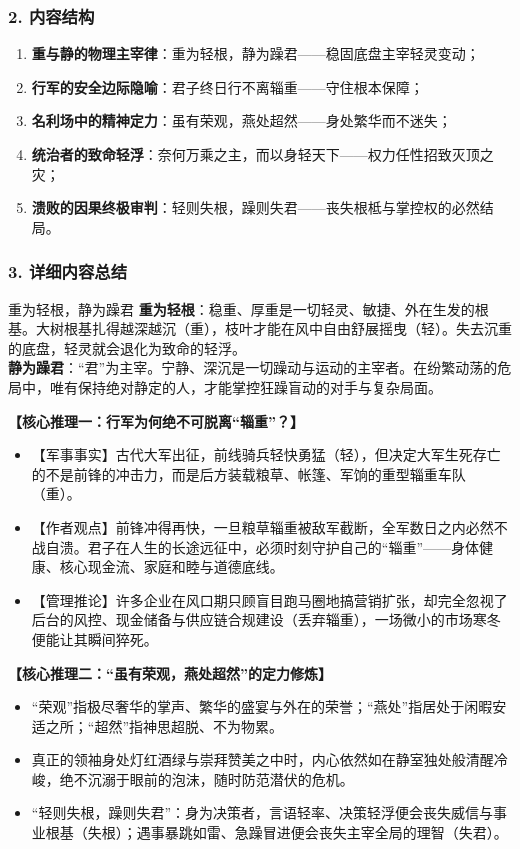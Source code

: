 \subsubsection{2. 内容结构}
\begin{enumerate}
    \item \textbf{重与静的物理主宰律}：重为轻根，静为躁君——稳固底盘主宰轻灵变动；
    \item \textbf{行军的安全边际隐喻}：君子终日行不离辎重——守住根本保障；
    \item \textbf{名利场中的精神定力}：虽有荣观，燕处超然——身处繁华而不迷失；
    \item \textbf{统治者的致命轻浮}：奈何万乘之主，而以身轻天下——权力任性招致灭顶之灾；
    \item \textbf{溃败的因果终极审判}：轻则失根，躁则失君——丧失根柢与掌控权的必然结局。
\end{enumerate}

\subsubsection{3. 详细内容总结}

\begin{ConceptBox}{重为轻根，静为躁君}
\textbf{重为轻根}：稳重、厚重是一切轻灵、敏捷、外在生发的根基。大树根基扎得越深越沉（重），枝叶才能在风中自由舒展摇曳（轻）。失去沉重的底盘，轻灵就会退化为致命的轻浮。\\
\textbf{静为躁君}：“君”为主宰。宁静、深沉是一切躁动与运动的主宰者。在纷繁动荡的危局中，唯有保持绝对静定的人，才能掌控狂躁盲动的对手与复杂局面。
\end{ConceptBox}

\noindent\textbf{【核心推理一：行军为何绝不可脱离“辎重”？】}
\begin{itemize}
    \item 【军事事实】古代大军出征，前线骑兵轻快勇猛（轻），但决定大军生死存亡的不是前锋的冲击力，而是后方装载粮草、帐篷、军饷的重型辎重车队（重）。
    \item 【作者观点】前锋冲得再快，一旦粮草辎重被敌军截断，全军数日之内必然不战自溃。君子在人生的长途远征中，必须时刻守护自己的“辎重”——身体健康、核心现金流、家庭和睦与道德底线。
    \item 【管理推论】许多企业在风口期只顾盲目跑马圈地搞营销扩张，却完全忽视了后台的风控、现金储备与供应链合规建设（丢弃辎重），一场微小的市场寒冬便能让其瞬间猝死。
\end{itemize}

\noindent\textbf{【核心推理二：“虽有荣观，燕处超然”的定力修炼】}
\begin{itemize}
    \item “荣观”指极尽奢华的掌声、繁华的盛宴与外在的荣誉；“燕处”指居处于闲暇安适之所；“超然”指神思超脱、不为物累。
    \item 真正的领袖身处灯红酒绿与崇拜赞美之中时，内心依然如在静室独处般清醒冷峻，绝不沉溺于眼前的泡沫，随时防范潜伏的危机。
    \item “轻则失根，躁则失君”：身为决策者，言语轻率、决策轻浮便会丧失威信与事业根基（失根）；遇事暴跳如雷、急躁冒进便会丧失主宰全局的理智（失君）。
\end{itemize}

